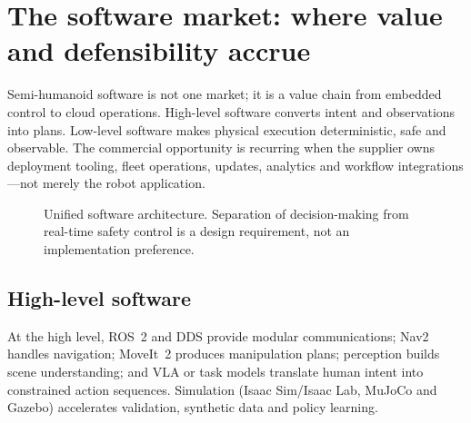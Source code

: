 \documentclass[11pt,a4paper]{article}
\begin{document}
\section{The software market: where value and defensibility accrue}

Semi-humanoid software is not one market; it is a value chain from embedded control to cloud operations. High-level software converts intent and observations into plans. Low-level software makes physical execution deterministic, safe and observable. The commercial opportunity is recurring when the supplier owns deployment tooling, fleet operations, updates, analytics and workflow integrations---not merely the robot application.

\begin{figure}[ht]
\centering
{}
\caption{Unified software architecture. Separation of decision-making from real-time safety control is a design requirement, not an implementation preference.}
\label{fig:stack}
\end{figure}

\subsection{High-level software}

At the high level, ROS~2 and DDS provide modular communications; Nav2 handles navigation; MoveIt~2 produces manipulation plans; perception builds scene understanding; and VLA or task models translate human intent into constrained action sequences. Simulation (Isaac Sim/Isaac Lab, MuJoCo and Gazebo) accelerates validation, synthetic data and policy learning.\cite{isaac,isaacsim,mujoco,gazebo}
\end{document}
